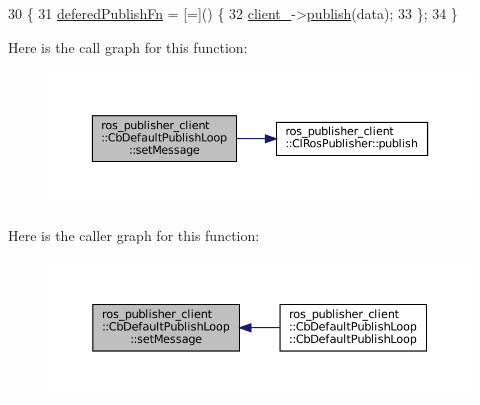 \begin{DoxyCode}
30     \{
31         \hyperlink{classros__publisher__client_1_1CbDefaultPublishLoop_a321f79f015449668a184cd30b6c2ad51}{deferedPublishFn} = [=]() \{
32             \hyperlink{classros__publisher__client_1_1CbDefaultPublishLoop_a90fc344876c742774a73542e338c3bfd}{client\_}->\hyperlink{classros__publisher__client_1_1ClRosPublisher_a9e62a3581a730cd2e287e560d04d151b}{publish}(data);
33         \};
34     \}
\end{DoxyCode}
Here is the call graph for this function\+:
\nopagebreak
\begin{figure}[H]
\begin{center}
\leavevmode
\includegraphics[width=350pt]{classros__publisher__client_1_1CbDefaultPublishLoop_a8bba9039f6a6841c21e9bc89c2fd8ab7_cgraph}
\end{center}
\end{figure}
Here is the caller graph for this function\+:
\nopagebreak
\begin{figure}[H]
\begin{center}
\leavevmode
\includegraphics[width=350pt]{classros__publisher__client_1_1CbDefaultPublishLoop_a8bba9039f6a6841c21e9bc89c2fd8ab7_icgraph}
\end{center}
\end{figure}
\mbox{\label{classros__publisher__client_1_1CbDefaultPublishLoop_aac7546e32e37fd833eac47d3976463b3}} 
